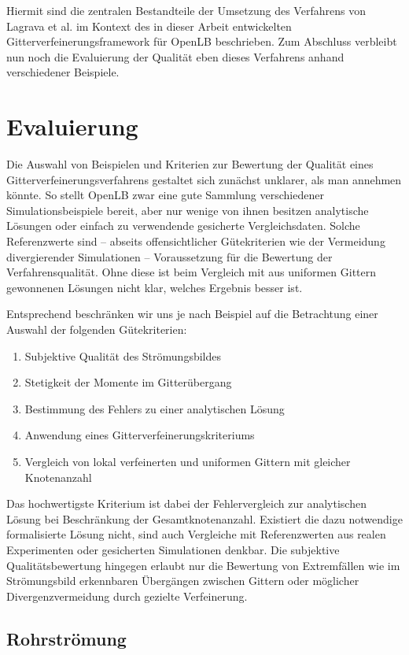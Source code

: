 Hiermit sind die zentralen Bestandteile der Umsetzung des Verfahrens von Lagrava et al. im Kontext des in dieser Arbeit entwickelten Gitterverfeinerungsframework für OpenLB beschrieben. Zum Abschluss verbleibt nun noch die Evaluierung der Qualität eben dieses Verfahrens anhand verschiedener Beispiele.

\newpage
\section{Evaluierung}

Die Auswahl von Beispielen und Kriterien zur Bewertung der Qualität eines Gitterverfeinerungsverfahrens gestaltet sich zunächst unklarer, als man annehmen könnte. So stellt OpenLB zwar eine gute Sammlung verschiedener Simulationsbeispiele bereit, aber nur wenige von ihnen besitzen analytische Lösungen oder einfach zu verwendende gesicherte Vergleichsdaten. Solche Referenzwerte sind -- abseits offensichtlicher Gütekriterien wie der Vermeidung divergierender Simulationen -- Voraussetzung für die Bewertung der Verfahrensqualität. Ohne diese ist beim Vergleich mit aus uniformen Gittern gewonnenen Lösungen nicht klar, welches Ergebnis besser ist.

Entsprechend beschränken wir uns je nach Beispiel auf die Betrachtung einer Auswahl der folgenden Gütekriterien:
\begin{enumerate}
	\item Subjektive Qualität des Strömungsbildes
	\item Stetigkeit der Momente im Gitterübergang
	\item Bestimmung des Fehlers zu einer analytischen Lösung
	\item Anwendung eines Gitterverfeinerungskriteriums
	\item Vergleich von lokal verfeinerten und uniformen Gittern mit gleicher Knotenanzahl
\end{enumerate}

Das hochwertigste Kriterium ist dabei der Fehlervergleich zur analytischen Lösung bei Beschränkung der Gesamtknotenanzahl. Existiert die dazu notwendige formalisierte Lösung nicht, sind auch Vergleiche mit Referenzwerten aus realen Experimenten oder gesicherten Simulationen denkbar. Die subjektive Qualitätsbewertung hingegen erlaubt nur die Bewertung von Extremfällen wie im Strömungsbild erkennbaren Übergängen zwischen Gittern oder möglicher Divergenzvermeidung durch gezielte Verfeinerung.

\newpage
\subsection{Rohrströmung}

